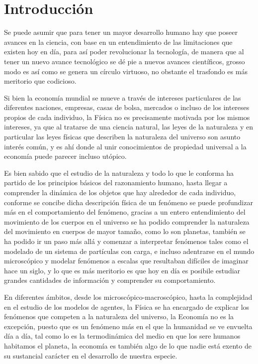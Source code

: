 %
\chapter{Introducción}
\label{sec:intro}
Se puede asumir que para tener un mayor desarrollo humano hay que poseer avances en la ciencia, con base en un entendimiento de las limitaciones que existen hoy en día, para así poder revolucionar la tecnolog\'ia, de manera que al tener un nuevo avance tecnológico se dé pie a nuevos avances científicos, grosso modo es así como se genera un círculo virtuoso, no obstante el trasfondo es más meritorio que codicioso.
\newline

Si bien la economía mundial se mueve a través de intereses particulares de las diferentes naciones, empresas, casas de bolsa, mercados o incluso de los intereses propios de cada individuo, la Física no es precisamente motivada por los mismos intereses, ya que al tratarse de una ciencia natural, las leyes de la naturaleza y en particular las leyes físicas que describen la naturaleza del universo son asunto interés común, y es ahí donde al unir conocimientos de propiedad universal a la economía puede parecer incluso utópico. \newline

\hspace{1cm}Es bien sabido que el estudio de la naturaleza y todo lo que le conforma ha partido de los principios básicos del razonamiento humano, hasta llegar a comprender la din\'amica de los objetos que hay alrededor de cada individuo, conforme se concibe dicha descripción f\'isica de un fen\'omeno se puede profundizar m\'as en el comportamiento del fenómeno, gracias a un entero entendimiento del movimiento de los cuerpos en el universo se ha podido comprender la naturaleza del movimiento en cuerpos de mayor tamaño, como lo son planetas, tambi\'en se ha podido ir un paso m\'as all\'a y comenzar a interpretar fen\'omenos tales como el modelado de un sistema de part\'iculas con carga, e incluso adentrarse en el mundo microsc\'opico y modelar fenómenos a escalas que resultaban dif\'iciles de imaginar hace un siglo, y lo que es más meritorio es que hoy en día es posibile estudiar grandes cantidades de información y comprender su comportamiento.
\newline


\hspace{1cm}En diferentes \'ambitos, desde los microsc\'opico-macrosc\'opico, hasta la complejidad en el estudio de los modelos de agentes, la F\'isica se ha encargado de explicar los fen\'omenos que competen a la naturaleza del universo, la Econom\'ia no es la excepci\'on, puesto que es un fen\'omeno m\'as en el que la humanidad se ve envuelta d\'ia a d\'ia, tal como lo es la termodin\'amica del medio en que los sere humanos habitamos el planeta, la econom\'ia es tambi\'en algo de lo que nadie est\'a exento de su sustancial car\'acter en el desarrollo de nuestra especie.
\newline

